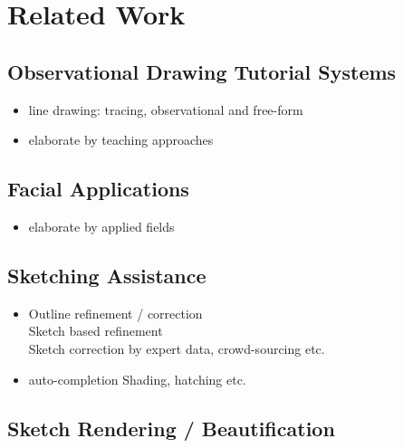 \chapter{Related Work}\label{sec-related}

\section{Observational Drawing Tutorial Systems}
	
	\begin{itemize}
		\item line drawing: tracing, observational and free-form
		\item elaborate by teaching approaches

	\end{itemize}
	
	

\section{Facial Applications}

	\begin{itemize} 
		\item elaborate by applied fields 
		
	\end{itemize}
	
	
	
\section{Sketching Assistance}
	
	\begin{itemize}
		\item Outline refinement / correction \\
				 Sketch based refinement \\
				Sketch correction by expert data, crowd-sourcing etc.
		\item auto-completion
				Shading, hatching etc.
			
	\end{itemize}
	


\section{Sketch Rendering / Beautification}


